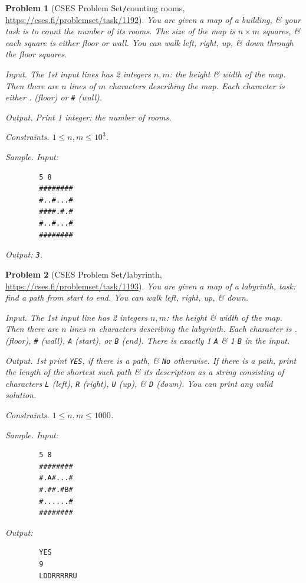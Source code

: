 \documentclass[oneside]{book}
\newtheorem{problem}{Problem}
\begin{document}
\begin{problem}[CSES Problem Set{\tt/}counting rooms, \url{https://cses.fi/problemset/task/1192}]
	You are given a map of a building, \& your task is to count the number of its rooms. The size of the map is $n\times m$ squares, \& each square is either floor or wall. You can walk left, right, up, \& down through the floor squares.
	\item {\sf Input.} The 1st input lines has 2 integers $n,m$: the height \& width of the map. Then there are $n$ lines of $m$ characters describing the map. Each character is either . (floor) or {\tt\#} (wall).
	\item {\it Output.} Print 1 integer: the number of rooms.
	\item {\sf Constraints.} $1\le n,m\le10^3$.
	\item {\sf Sample.} Input:
	\begin{verbatim}
		5 8
		########
		#..#...#
		####.#.#
		#..#...#
		########		
	\end{verbatim}
	Output: {\tt3}.
\end{problem}

\begin{problem}[CSES Problem Set{\tt/}labyrinth, \url{https://cses.fi/problemset/task/1193}]
	You are given a map of a labyrinth, task: find a path from start to end. You can walk left, right, up, \& down.
	\item {\sf Input.} The 1st input line has 2 integers $n,m$: the height \& width of the map. Then there are $n$ lines $m$ characters describing the labyrinth. Each character is . (floor), {\tt\#} (wall), {\tt A} (start), or {\tt B} (end). There is exactly 1 {\tt A} \& 1 {\tt B} in the input.
	\item {\sf Output.} 1st print {\tt YES}, if there is a path, \& {\tt No} otherwise. If there is a path, print the length of the shortest such path \& its description as a string consisting of characters {\tt L} (left), {\tt R} (right), {\tt U} (up), \& {\tt D} (down). You can print any valid solution.
	\item {\sf Constraints.} $1\le n,m\le1000$.
	\item {\sf Sample.} Input:
	\begin{verbatim}
		5 8
		########
		#.A#...#
		#.##.#B#
		#......#
		########
	\end{verbatim}
	Output:
	\begin{verbatim}
		YES
		9
		LDDRRRRRU
	\end{verbatim}
\end{problem}
\end{document}
